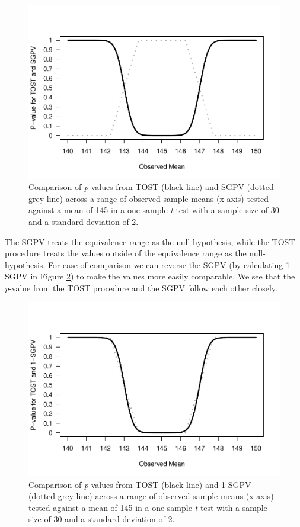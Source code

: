 \documentclass[,man,floatsintext]{apa6}
\begin{document}
\begin{figure}
\centering
\includegraphics{manuscript_files/figure-latex/TOSTSGPV1-1.pdf}
\caption{\label{fig:TOSTSGPV1}Comparison of \emph{p}-values from TOST (black line) and SGPV (dotted grey line) across a range of observed sample means (x-axis) tested against a mean of 145 in a one-sample \emph{t}-test with a sample size of 30 and a standard deviation of 2.}
\end{figure}

The SGPV treats the equivalence range as the null-hypothesis, while the TOST procedure treats the values outside of the equivalence range as the null-hypothesis. For ease of comparison we can reverse the SGPV (by calculating 1-SGPV in Figure \ref{fig:TOSTSGPV2}) to make the values more easily comparable. We see that the \emph{p}-value from the TOST procedure and the SGPV follow each other closely.

\begin{figure}
\centering
\includegraphics{manuscript_files/figure-latex/TOSTSGPV2-1.pdf}
\caption{\label{fig:TOSTSGPV2}Comparison of \emph{p}-values from TOST (black line) and 1-SGPV (dotted grey line) across a range of observed sample means (x-axis) tested against a mean of 145 in a one-sample \emph{t}-test with a sample size of 30 and a standard deviation of 2.}
\end{figure}
\end{document}
